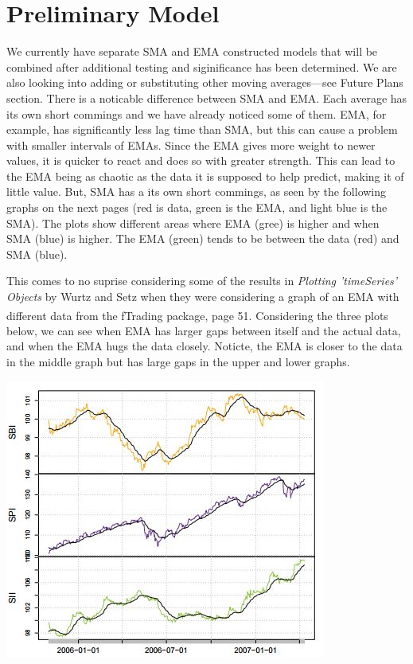 \documentclass[11pt]{article}
\begin{document}
\section*{\hspace{-.5cm} Preliminary Model}\label{PM}
We currently have separate SMA and EMA constructed models that will be combined after additional testing and siginificance has been determined. We are also looking into adding or substituting other moving averages---see Future Plans section. There is a noticable difference between SMA and EMA. Each average has its own short commings and we have already noticed some of them. EMA, for example, has significantly less lag time than SMA, but this can cause a problem with smaller intervals of EMAs. Since the EMA gives more weight to newer values, it is quicker to react and does so with greater strength. This can lead to the EMA being as chaotic as the data it is supposed to help predict, making it of little value. But, SMA has a its own short commings, as seen by the following graphs on the next pages (red is data, green is the EMA, and light blue is the SMA). The plots show different areas where EMA (gree) is higher and when SMA (blue) is higher. The EMA (green) tends to be between the data (red) and SMA (blue).

This comes to no suprise considering some of the results in \textit{Plotting 'timeSeries' Objects} by Wurtz and Setz when they were considering a graph of an EMA with different data from the fTrading package, page 51.\textsuperscript{\cite{WS}} Considering the three plots below, we can see when EMA has larger gaps between itself and the actual data, and when the EMA hugs the data closely. Noticte, the EMA is closer to the data in the middle graph but has large gaps in the upper and lower graphs.

\includegraphics[]{WSEMAplots.jpg}
\end{document}
